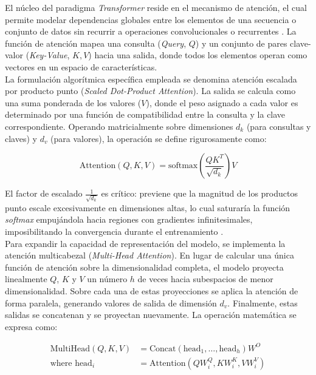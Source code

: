 El núcleo del paradigma \textit{Transformer} reside en el mecanismo de atención, el cual permite modelar dependencias globales entre los elementos de una secuencia o conjunto de datos sin recurrir a operaciones convolucionales o recurrentes \cite{vaswani2017attention}. La función de atención mapea una consulta (\textit{Query}, $Q$) y un conjunto de pares clave-valor (\textit{Key-Value}, $K, V$) hacia una salida, donde todos los elementos operan como vectores en un espacio de características. \\

La formulación algorítmica específica empleada se denomina atención escalada por producto punto (\textit{Scaled Dot-Product Attention}). La salida se calcula como una suma ponderada de los valores ($V$), donde el peso asignado a cada valor es determinado por una función de compatibilidad entre la consulta y la clave correspondiente. Operando matricialmente sobre dimensiones $d_k$ (para consultas y claves) y $d_v$ (para valores), la operación se define rigurosamente como:

\begin{equation}
    \text{Attention}(Q, K, V) = \text{softmax}\left(\frac{QK^T}{\sqrt{d_k}}\right)V
\end{equation}

El factor de escalado $\frac{1}{\sqrt{d_k}}$ es crítico: previene que la magnitud de los productos punto escale excesivamente en dimensiones altas, lo cual saturaría la función \textit{softmax} empujándola hacia regiones con gradientes infinitesimales, imposibilitando la convergencia durante el entrenamiento \cite{vaswani2017attention}. \\

Para expandir la capacidad de representación del modelo, se implementa la atención multicabezal (\textit{Multi-Head Attention}). En lugar de calcular una única función de atención sobre la dimensionalidad completa, el modelo proyecta linealmente $Q$, $K$ y $V$ un número $h$ de veces hacia subespacios de menor dimensionalidad. Sobre cada una de estas proyecciones se aplica la atención de forma paralela, generando valores de salida de dimensión $d_v$. Finalmente, estas salidas se concatenan y se proyectan nuevamente. La operación matemática se expresa como:

\begin{equation}
    \begin{aligned}
        \text{MultiHead}(Q, K, V) &= \text{Concat}(\text{head}_1, \dots, \text{head}_h)W^O \\
        \text{where } \text{head}_i &= \text{Attention}(QW_i^Q, KW_i^K, VW_i^V)
    \end{aligned}
\end{equation}

